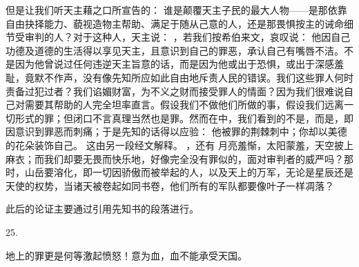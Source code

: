  但是让我们听天主藉之口所宣告的： 谁是颠覆天主子民的最大人物——是那依靠自由抉择能力、藐视造物主帮助、满足于随从己意的人，还是那畏惧按主的诫命细节受审判的人？对于这种人，天主说： ，若我们按希伯来文，哀叹说： 他因自己功德及道德的生活得以享见天主，且意识到自己的罪恶，承认自己有嘴唇不洁。不是因为他曾说过任何违逆天主旨意的话，而是因为他或出于恐惧，或出于深感羞耻，竟默不作声，没有像先知所应如此自由地斥责人民的错误。我们这些罪人何时责备过犯过者？我们谄媚财富，为不义之财而接受罪人的情面？因为我们很难说自己对需要其帮助的人完全坦率直言。假设我们不做他们所做的事，假设我们远离一切形式的罪；但闭口不言真理当然也是罪。然而在中，我们看到的不是，而是，即因意识到罪恶而刺痛；于是先知的话得以应验： 他被罪的荆棘刺中；你却以美德的花朵装饰自己。  这由另一段经文解释。 ，还有  月亮羞惭，太阳蒙羞，天空披上麻衣；而我们却要无畏而快乐地，好像完全没有罪似的，面对审判者的威严吗？那时，山岳要溶化，即一切因骄傲而被举起的人，以及天上的万军，无论是星辰还是天使的权势，当诸天被卷起如同书卷，他们所有的军队都要像叶子一样凋落？\par

此后的论证主要通过引用先知书的段落进行。\par

25.\par

  地上的罪更是何等激起愤怒！意为血，血不能承受天国。\par

